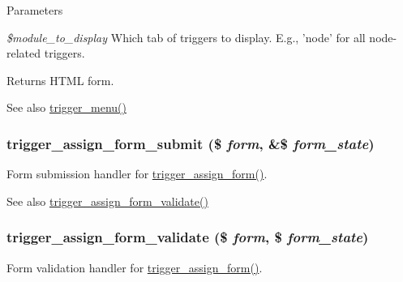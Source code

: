 \begin{DoxyParams}{Parameters}
\item[{\em \$module\_\-to\_\-display}]Which tab of triggers to display. E.g., 'node' for all node-\/related triggers.\end{DoxyParams}
\begin{DoxyReturn}{Returns}
HTML form.
\end{DoxyReturn}
\begin{DoxySeeAlso}{See also}
\hyperlink{trigger_8module_a467708b4dec3a4e2c9eba80d0c94db3c}{trigger\_\-menu()} 
\end{DoxySeeAlso}
\hypertarget{trigger_8admin_8inc_adbb964aba3db9ae31067feff7af230ab}{
\subsubsection[{trigger\_\-assign\_\-form\_\-submit}]{\setlength{\rightskip}{0pt plus 5cm}trigger\_\-assign\_\-form\_\-submit (\$ {\em form}, \/  \&\$ {\em form\_\-state})}}
\label{trigger_8admin_8inc_adbb964aba3db9ae31067feff7af230ab}
Form submission handler for \hyperlink{group__forms_gab1bcec33dbc9ec1071f889662dfca03c}{trigger\_\-assign\_\-form()}.

\begin{DoxySeeAlso}{See also}
\hyperlink{trigger_8admin_8inc_ab8f232934437a99af0903a397c090934}{trigger\_\-assign\_\-form\_\-validate()} 
\end{DoxySeeAlso}
\hypertarget{trigger_8admin_8inc_ab8f232934437a99af0903a397c090934}{
\subsubsection[{trigger\_\-assign\_\-form\_\-validate}]{\setlength{\rightskip}{0pt plus 5cm}trigger\_\-assign\_\-form\_\-validate (\$ {\em form}, \/  \$ {\em form\_\-state})}}
\label{trigger_8admin_8inc_ab8f232934437a99af0903a397c090934}
Form validation handler for \hyperlink{group__forms_gab1bcec33dbc9ec1071f889662dfca03c}{trigger\_\-assign\_\-form()}.

